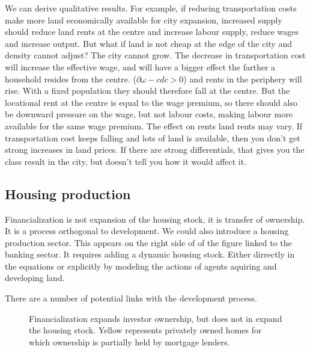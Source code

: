 We can derive qualitative results. For example, if reducing transportation costs make more land economically available for city expansion, increased supply should reduce land rents at the centre and increase labour supply, reduce wages and increase output.  But what if land is not cheap at the edge of the city and density cannot adjust? The city cannot  grow. The decrease in transportation cost will increase  the effective wage, and will have a bigger effect the farther  a household resides from the centre. ($\partial{\omega-cd}{c}>0$) and rents in the periphery will rise. With a fixed population they should therefore fall at the centre. But the locational rent at the centre is equal to the wage premium, so there should also be downward pressure on the wage, but not labour costs, making labour more available for the same wage premium. The effect on rents land rents may vary. If transportation cost keeps falling and lots of land is available, then you don't get strong increases in land prices. If there are strong differentials, that gives you the class result in the city, but doesn't tell you how it would affect it. 

\subsection{Housing production}

Financialization is not expansion of the housing stock, it is transfer of ownership. It is a process orthogonal to development. 
We could also introduce a housing production sector. This appears on the right side of of the figure linked to the banking sector. It requires adding a dynamic housing stock. Either dirrectly in the equations or explicitly by modeling the actions of agents aquiring and developing land. %




There are a number of potential links with the development process.

\begin{figure}
\begin{center}

\end{center}
\caption{Financialization expands investor ownership, but does not in expand the housing stock. Yellow represents privately owned homes for which ownership is partially held by mortgage lenders.}
\label{fig-financialization-expansion}
\end{figure}


